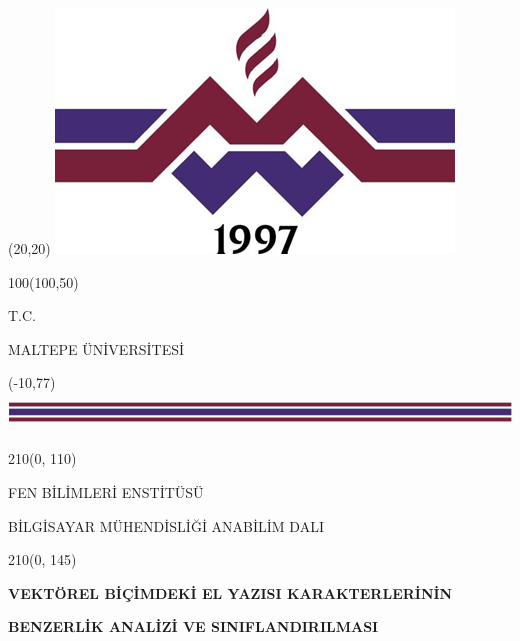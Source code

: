\begin{titlepage}
\begin{textblock}{0}(20,20)
	\includegraphics[scale=2.0]{images/maltepe}
\end{textblock}

\begin{textblock}{100}(100,50)
	\centering
	\begin{large}
	T.C.
		
	MALTEPE ÜNİVERSİTESİ
	\end{large}
\end{textblock}

\begin{textblock}{0}(-10,77)
	\includegraphics[width=220mm,height=1cm]{images/maltepe_hbar}
\end{textblock}

\begin{textblock}{210}(0, 110)
	\centering
	\begin{large}
	FEN BİLİMLERİ ENSTİTÜSÜ
	
	\vspace{\baselineskip}
	BİLGİSAYAR MÜHENDİSLİĞİ ANABİLİM DALI
	\end{large}
\end{textblock}

\begin{textblock}{210}(0, 145)
	\centering
	
	\begin{large}	
		\textbf{VEKTÖREL BİÇİMDEKİ EL YAZISI KARAKTERLERİNİN}
		
		\vspace{\baselineskip}
		\textbf{BENZERLİK ANALİZİ VE SINIFLANDIRILMASI}
	\end{large}
\end{textblock}


\end{titlepage}
